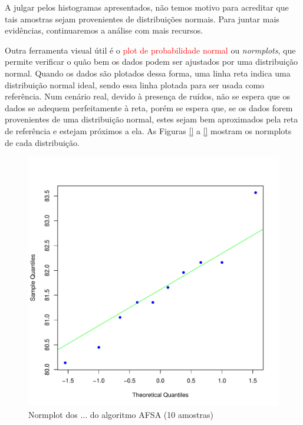 \documentclass[conference]{IEEEtran}
\begin{document}
A julgar pelos histogramas apresentados, não temos motivo para acreditar que tais amostras sejam provenientes de distribuições normais.
Para juntar mais evidências, continuaremos a análise com mais recursos.

Outra ferramenta visual útil é o \textcolor{red}{plot de probabilidade normal} ou \textit{normplots}, que permite verificar o quão bem os dados podem ser ajustados por uma distribuição normal.
Quando os dados são plotados dessa forma, uma linha reta indica uma distribuição normal ideal, sendo essa linha plotada para ser usada como referência.
Num cenário real, devido à presença de ruídos, não se espera que os dados se adequem perfeitamente à reta, porém se espera que, se os dados forem provenientes de uma distribuição normal, estes sejam bem aproximados pela reta de referência e estejam próximos a ela.
As Figuras \ref{} a \ref{} mostram os normplots de cada distribuição.

\begin{figure}[h]
	\centering
	\includegraphics[width=\linewidth]{img/bluenorm_afsa_cmfdr.pdf}
	\caption{Normplot dos ... do algoritmo AFSA (10 amostras)}
	\label{fig:hist_afsa_cmfdr}
\end{figure}
\end{document}
